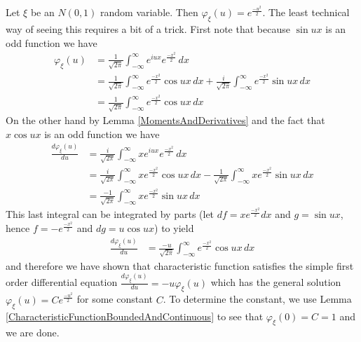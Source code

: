 \begin{examp}\label{FourierTransformGaussian}Let $\xi$ be an $N(0,1)$ random variable.  Then
  $\varphi_\xi(u) = e^{\frac{-u^2}{2}}$.  The least technical way of
  seeing this requires a bit of a trick.  First note that because $\sin
  ux$ is an odd function we have
\begin{align*}
\varphi_\xi(u) &= \frac{1}{\sqrt{2\pi}}\int_{-\infty}^\infty e^{iux}
e^{\frac{-x^2}{2}} \, dx \\
&= \frac{1}{\sqrt{2\pi}}\int_{-\infty}^\infty e^{\frac{-x^2}{2}}\cos ux
\, dx + \frac{i}{\sqrt{2\pi}}\int_{-\infty}^\infty e^{\frac{-x^2}{2}}\sin ux
\, dx \\
&=  \frac{1}{\sqrt{2\pi}}\int_{-\infty}^\infty e^{\frac{-x^2}{2}}\cos
ux \, dx
\end{align*}
On the other hand by Lemma \ref{MomentsAndDerivatives} and the fact
that $x \cos ux$ is an odd function we have 
\begin{align*}
\frac{d\varphi_\xi(u)}{du} &=
\frac{i}{\sqrt{2\pi}}\int_{-\infty}^\infty x e^{iux}
e^{\frac{-x^2}{2}} \, dx \\
&= \frac{i}{\sqrt{2\pi}}\int_{-\infty}^\infty x e^{\frac{-x^2}{2}}\cos ux
\, dx - \frac{1}{\sqrt{2\pi}}\int_{-\infty}^\infty x e^{\frac{-x^2}{2}}\sin ux
\, dx \\
&=  \frac{-1}{\sqrt{2\pi}}\int_{-\infty}^\infty x e^{\frac{-x^2}{2}}\sin ux
\, dx
\end{align*}
This last integral can be integrated by parts (let $df = x
e^{\frac{-x^2}{2}} dx$ and $g = \sin ux$, hence $f =
-e^{\frac{-x^2}{2}}$ and $dg = u\cos ux$) to yield
\begin{align*}
\frac{d\varphi_\xi(u)}{du} &=\frac{-u}{\sqrt{2\pi}}\int_{-\infty}^\infty e^{\frac{-x^2}{2}}\cos
ux \, dx
\end{align*}
and therefore we have shown that characteristic function satisfies the
simple first order differential equation $\frac{d\varphi_\xi(u)}{du} =
-u \varphi_\xi(u)$ which has the general solution $\varphi_\xi(u) = C
e^\frac{-u^2}{2}$ for some constant $C$.  To determine the constant,
we use Lemma
\ref{CharacteristicFunctionBoundedAndContinuous} to see that
$\varphi_\xi(0) = C = 1$ and we are done.
\end{examp}

